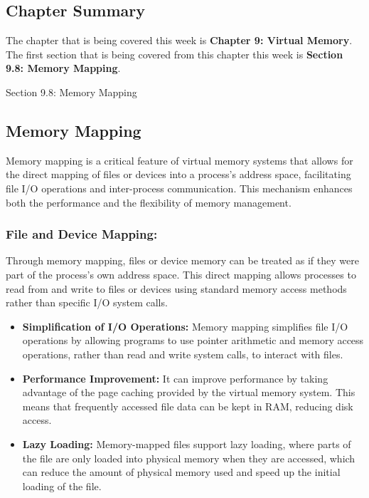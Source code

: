 \subsection{Chapter Summary}

The chapter that is being covered this week is \textbf{Chapter 9: Virtual Memory}. The first section that is being covered from this chapter this week is \textbf{Section 9.8: Memory Mapping}.

\begin{notes}{Section 9.8: Memory Mapping}
    \subsection*{Memory Mapping}

    Memory mapping is a critical feature of virtual memory systems that allows for the direct mapping of files or devices into a process's address space, facilitating file I/O operations and inter-process 
    communication. This mechanism enhances both the performance and the flexibility of memory management. \vspace*{1em}
    
    \subsubsection*{File and Device Mapping:}
    
    Through memory mapping, files or device memory can be treated as if they were part of the process's own address space. This direct mapping allows processes to read from and write to files or devices 
    using standard memory access methods rather than specific I/O system calls.
    
    \begin{itemize}
        \item \textbf{Simplification of I/O Operations:} Memory mapping simplifies file I/O operations by allowing programs to use pointer arithmetic and memory access operations, rather than read and 
        write system calls, to interact with files.
        \item \textbf{Performance Improvement:} It can improve performance by taking advantage of the page caching provided by the virtual memory system. This means that frequently accessed file data 
        can be kept in RAM, reducing disk access.
        \item \textbf{Lazy Loading:} Memory-mapped files support lazy loading, where parts of the file are only loaded into physical memory when they are accessed, which can reduce the amount of physical 
        memory used and speed up the initial loading of the file.
    \end{itemize}
    

\end{notes}
